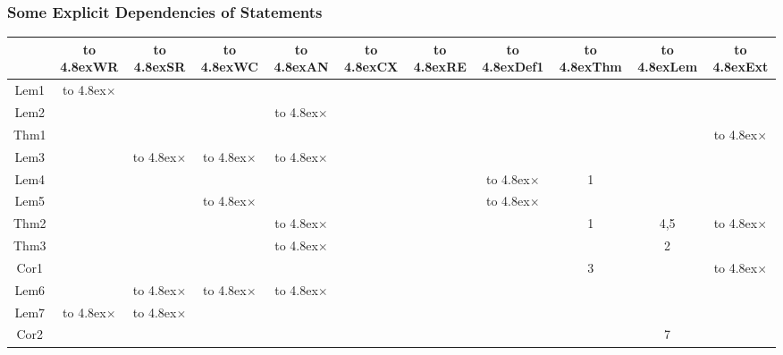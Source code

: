 \documentclass{beamer}
\begin{document}
\def\bb#1{\hbox to 4.8ex{\hspace*{\fill}#1\hspace*{\fill}}}
\def\t{\bb{$\times$}}
\begin{frame}
\small
\frametitle{Some Explicit Dependencies of Statements}
\begin{tabular}{c||c|c|c|c|c|c|c|c|c|c}
     & \bb{WR} & \bb{SR} & \bb{WC} & \bb{AN} & \bb{CX} & \bb{RE} & \bb{Def1} & \bb{Thm}  & \bb{Lem} & \bb{Ext}\\\hline\hline
Lem1 & \t &    &    &    &    &    &      &      &      &\\\hline
Lem2 &    &    &    & \t &    &    &      &      &      &\\\hline
Thm1 &    &    &    &    &    &    &      &      &      &\t\\\hline
Lem3 &    & \t & \t & \t &    &    &      &      &      &\\\hline
Lem4 &    &    &    &    &    &    &  \t  & 1    &      &\\\hline
Lem5 &    &    & \t &    &    &    &  \t  &      &      &\\\hline
Thm2 &    &    &    & \t &    &    &      & 1    & 4,5  &\t\\\hline
Thm3 &    &    &    & \t &    &    &      &      & 2    &\\\hline
Cor1 &    &    &    &    &    &    &      & 3    &      &\t\\\hline
Lem6 &    & \t & \t & \t &    &    &      &      &      &\\\hline
Lem7 & \t & \t &    &    &    &    &      &      &      &\\\hline
Cor2 &    &    &    &    &    &    &      &      & 7    &\\\hline
\end{tabular}
\end{frame}
\end{document}
